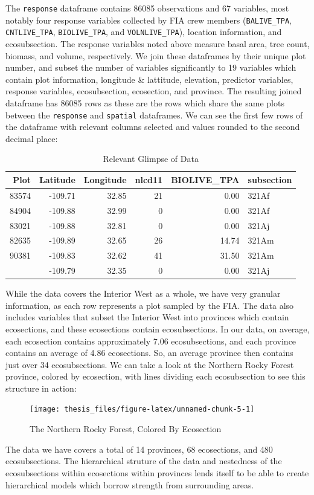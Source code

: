 \documentclass[12pt,twoside]{reedthesis}
\begin{document}
The \texttt{response} dataframe contains 86085 observations and 67 variables, most notably four response variables collected by FIA crew members (\texttt{BALIVE\_TPA}, \texttt{CNTLIVE\_TPA}, \texttt{BIOLIVE\_TPA}, and \texttt{VOLNLIVE\_TPA}), location information, and ecosubsection. The response variables noted above measure basal area, tree count, biomass, and volume, respectively. We join these dataframes by their unique plot number, and subset the number of variables significantly to 19 variables which contain plot information, longitude \& lattitude, elevation, predictor variables, response variables, ecosubsection, ecosection, and province. The resulting joined dataframe has 86085 rows as these are the rows which share the same plots between the \texttt{response} and \texttt{spatial} dataframes. We can see the first few rows of the dataframe with relevant columns selected and values rounded to the second decimal place:
\begin{longtable}[t]{rrrrrl}
\caption[Relevant Glimpse of Data]{\label{tab:unnamed-chunk-4}Relevant Glimpse of Data}\\
\toprule
Plot & Latitude & Longitude & nlcd11 & BIOLIVE\_TPA & subsection\\
\midrule
83574 & -109.71 & 32.85 & 21 & 0.00 & 321Af\\
84904 & -109.88 & 32.99 & 0 & 0.00 & 321Af\\
83021 & -109.88 & 32.81 & 0 & 0.00 & 321Aj\\
82635 & -109.89 & 32.65 & 26 & 14.74 & 321Am\\
90381 & -109.83 & 32.62 & 41 & 31.50 & 321Am\\
\addlinespace
81801 & -109.79 & 32.35 & 0 & 0.00 & 321Aj\\
\bottomrule
\end{longtable}
While the data covers the Interior West as a whole, we have very granular information, as each row represents a plot sampled by the FIA. The data also includes variables that subset the Interior West into provinces which contain ecosections, and these ecosections contain ecosubsections. In our data, on average, each ecosection contains approximately 7.06 ecosubsections, and each province contains an average of 4.86 ecosections. So, an average province then contains just over 34 ecosubsections. We can take a look at the Northern Rocky Forest province, colored by ecosection, with lines dividing each ecosubsection to see this structure in action:
\begin{figure}

{\centering \texttt{[image: thesis\_files/figure-latex/unnamed-chunk-5-1]} 

}

\caption{The Northern Rocky Forest, Colored By Ecosection}\label{fig:unnamed-chunk-5}
\end{figure}
The data we have covers a total of 14 provinces, 68 ecosections, and 480 ecosubsections. The hierarchical struture of the data and nestedness of the ecosubsections within ecosections within provinces lends itself to be able to create hierarchical models which borrow strength from surrounding areas.
\end{document}
